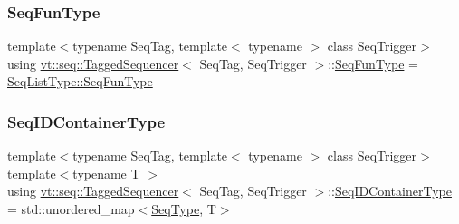 \mbox{\label{structvt_1_1seq_1_1_tagged_sequencer_a87fb29cbd9fa0823f2b4fad1ac111993}} 
\subsubsection{\texorpdfstring{Seq\+Fun\+Type}{SeqFunType}}
{\footnotesize\ttfamily template$<$typename Seq\+Tag, template$<$ typename $>$ class Seq\+Trigger$>$ \\
using \hyperlink{structvt_1_1seq_1_1_tagged_sequencer}{vt\+::seq\+::\+Tagged\+Sequencer}$<$ Seq\+Tag, Seq\+Trigger $>$\+::\hyperlink{structvt_1_1seq_1_1_tagged_sequencer_a87fb29cbd9fa0823f2b4fad1ac111993}{Seq\+Fun\+Type} =  \hyperlink{structvt_1_1seq_1_1_seq_list_afa5aacad3530e543d1ea016acbfb1cbb}{Seq\+List\+Type\+::\+Seq\+Fun\+Type}}

\mbox{\label{structvt_1_1seq_1_1_tagged_sequencer_a718515267468123a9036c30033d74237}} 
\subsubsection{\texorpdfstring{Seq\+I\+D\+Container\+Type}{SeqIDContainerType}}
{\footnotesize\ttfamily template$<$typename Seq\+Tag, template$<$ typename $>$ class Seq\+Trigger$>$ \\
template$<$typename T $>$ \\
using \hyperlink{structvt_1_1seq_1_1_tagged_sequencer}{vt\+::seq\+::\+Tagged\+Sequencer}$<$ Seq\+Tag, Seq\+Trigger $>$\+::\hyperlink{structvt_1_1seq_1_1_tagged_sequencer_a718515267468123a9036c30033d74237}{Seq\+I\+D\+Container\+Type} =  std\+::unordered\+\_\+map$<$\hyperlink{structvt_1_1seq_1_1_tagged_sequencer_a1c8ee839258d0f88c49ef660267a81d5}{Seq\+Type}, T$>$}

\mbox{\label{structvt_1_1seq_1_1_tagged_sequencer_a8df6e02cdb7c2b38870f7ee7776f6f9c}} 
